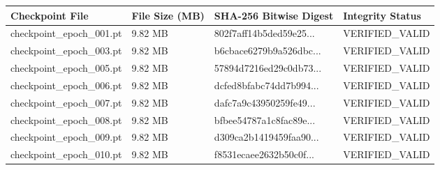 \begin{tabular}{llll}
\toprule
Checkpoint File & File Size (MB) & SHA-256 Bitwise Digest & Integrity Status \\
\midrule
checkpoint\_epoch\_001.pt & 9.82 MB & 802f7aff14b5ded59e25... & VERIFIED\_VALID \\
checkpoint\_epoch\_003.pt & 9.82 MB & b6cbace6279b9a526dbc... & VERIFIED\_VALID \\
checkpoint\_epoch\_005.pt & 9.82 MB & 57894d7216ed29c0db73... & VERIFIED\_VALID \\
checkpoint\_epoch\_006.pt & 9.82 MB & dcfed8bfabc74dd7b994... & VERIFIED\_VALID \\
checkpoint\_epoch\_007.pt & 9.82 MB & dafc7a9c43950259fe49... & VERIFIED\_VALID \\
checkpoint\_epoch\_008.pt & 9.82 MB & bfbee54787a1c8fac89e... & VERIFIED\_VALID \\
checkpoint\_epoch\_009.pt & 9.82 MB & d309ca2b1419459faa90... & VERIFIED\_VALID \\
checkpoint\_epoch\_010.pt & 9.82 MB & f8531ecaee2632b50c0f... & VERIFIED\_VALID \\
\bottomrule
\end{tabular}
